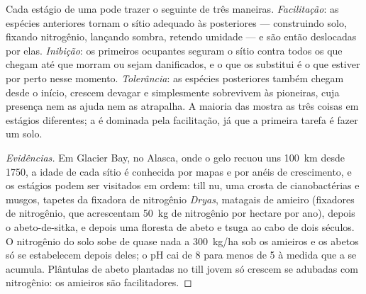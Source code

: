 \begin{proposition}\label{prop:b1:ecosystem-dynamics:mechanisms}
Cada estágio de uma  pode trazer o seguinte de três maneiras.
\emph{Facilitação}: as espécies anteriores tornam o sítio adequado às
posteriores --- construindo solo, fixando nitrogênio, lançando sombra,
retendo umidade --- e são então deslocadas por elas.
\emph{Inibição}: os primeiros ocupantes seguram o sítio contra todos os
que chegam até que morram ou sejam danificados, e o que os substitui é
o que estiver por perto nesse momento. \emph{Tolerância}: as espécies
posteriores também chegam desde o início, crescem devagar e
simplesmente sobrevivem às pioneiras, cuja presença nem as ajuda nem
as atrapalha. A maioria das  mostra as três coisas em
estágios diferentes; a  é dominada pela facilitação,
já que a primeira tarefa é fazer um solo.
\end{proposition}
\begin{proof}[Evidências]
Em Glacier Bay, no Alasca, onde o gelo recuou uns \qty{100}{km} desde
1750, a idade de cada sítio é conhecida por mapas e por anéis de
crescimento, e os estágios podem ser visitados em ordem: till nu, uma
crosta de cianobactérias e musgos, tapetes da fixadora de nitrogênio
\emph{Dryas}, matagais de amieiro (fixadores de nitrogênio, que
acrescentam \qty{50}{kg} de nitrogênio por hectare por ano), depois o
abeto-de-sitka, e depois uma floresta de abeto e tsuga ao cabo de dois
séculos. O nitrogênio do solo sobe de quase nada a \qty{300}{kg/ha}
sob os amieiros e os abetos só se estabelecem depois deles; o pH cai
de 8 para menos de 5 à medida que a  se acumula. Plântulas
de abeto plantadas no till jovem só crescem se adubadas com
nitrogênio: os amieiros são facilitadores.
\end{proof}


